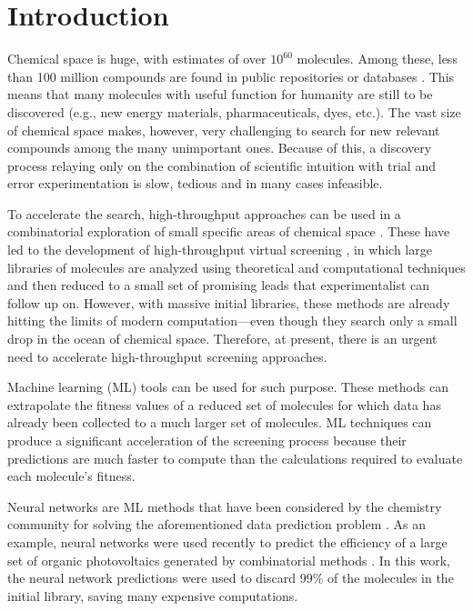 \section{Introduction}

Chemical space is huge, with estimates of over $10^{60}$ molecules. Among
these, less than 100 million compounds are found in public repositories or
databases \cite{Reymond_2012}. This means that many molecules with
useful function for humanity are still to be discovered (e.g., new energy
materials, pharmaceuticals, dyes, etc.). The vast size of chemical space makes,
however, very challenging to search for new relevant compounds among the many
unimportant ones. Because of this, a discovery process relaying only on
the combination of scientific intuition with trial and error experimentation is slow, tedious and in many cases infeasible.

To accelerate the search, high-throughput approaches can be used in a
combinatorial exploration of small specific areas of chemical space \cite{Rajan_2008}. These have led to the development of
high-throughput virtual screening \cite{Pyzer_Knapp_2015,Halls_2010,Curtarolo_2013,Husch_2015,Subramaniam_2008,Shoichet_2004,Jain_2013,G_mez_Bombarelli_2016}, in which large libraries of molecules are analyzed using
theoretical and computational techniques and then reduced to a small set of
promising leads that experimentalist can follow up on. However, with massive initial libraries, these methods are already
hitting the limits of modern computation---even though they search only a small
drop in the ocean of chemical space. Therefore, at present, there is an urgent
need to accelerate high-throughput screening approaches.

Machine learning (ML) tools can be used for such purpose. These methods can
extrapolate the fitness values of a reduced set of molecules for which data has
already been collected to a much larger set of molecules.  ML techniques can
produce a significant acceleration of the screening process because their
predictions are much faster to compute than the calculations required to
evaluate each molecule's fitness.

Neural networks are ML methods that have been considered by the chemistry
community for solving the aforementioned data prediction problem \cite{Zupan_1991,Burden_1996,Rodemerck_2004,Myint_2012,DuvMacetal15nfp}. As an example, neural networks  were used
recently to predict the efficiency of a large set of organic
photovoltaics generated by combinatorial methods \cite{Pyzer_Knapp_2015a}. In this work, the neural network
predictions were used to discard 99\% of the molecules in the initial
library, saving many expensive computations.

